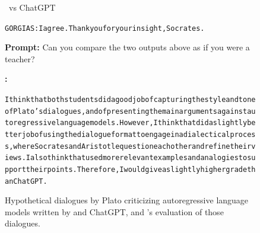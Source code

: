 \begin{figure}
\begin{AIbox}{\DV \ vs ChatGPT}
{\begin{alltt}
    GORGIAS: I agree. Thank you for your insight, Socrates.
    \end{alltt}}\vspace{-5px}
    
    \tcbline
    {\bf Prompt:} Can you compare the two outputs above as if you were a teacher?\\
    
    \parbox[t]{1.0\linewidth}{{\bf \DV:} \scriptsize \begin{alltt}
    I think that both students did a good job of capturing the style and tone of Plato's dialogues, and of presenting the main arguments against autoregressive language models. However, I think that {\DV} did a slightly better job of using the dialogue format to engage in a dialectical process, where Socrates and Aristotle question each other and refine their views. I also think that {\DV} used more relevant examples and analogies to support their points. Therefore, I would give {\DV} a slightly higher grade than ChatGPT. \end{alltt}}
    \end{AIbox}
        \caption{Hypothetical dialogues by Plato criticizing autoregressive language models written by {\DV} and ChatGPT, and {\DV}'s evaluation of those dialogues.}	\label{fig:platonic1}
    \end{figure}
    
